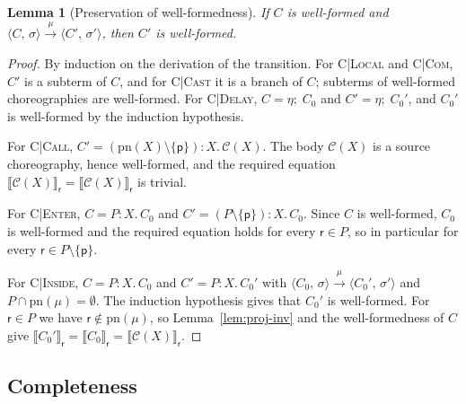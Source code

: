 \documentclass[11pt]{article}
\theoremstyle{plain}
\newtheorem{lemma}[theorem]{Lemma}
\theoremstyle{definition}
\theoremstyle{remark}
\newcommand{\seq}{;\;}
\newcommand{\pp}{\mathsf{p}}
\newcommand{\rr}{\mathsf{r}}
\newcommand{\pn}{\mathrm{pn}}
\newcommand{\conf}[2]{\langle #1,\, #2\rangle}
\newcommand{\lto}[1]{\xrightarrow{\;#1\;}}
\newcommand{\proj}[2]{\llbracket #1 \rrbracket_{#2}}
\newcommand{\rn}[1]{{\normalfont\scshape #1}}
\newcommand{\Defs}{\mathcal{C}}
\newcommand{\body}[1]{\Defs(#1)}
\newcommand{\rt}[3]{#1\mathbin{:}#2.\,#3}
\begin{document}
\begin{lemma}[Preservation of well-formedness]\label{lem:wf-pres}
  If $C$ is well-formed and $\conf{C}{\sigma}\lto{\mu}\conf{C'}{\sigma'}$,
  then $C'$ is well-formed.
\end{lemma}
\begin{proof}
  By induction on the derivation of the transition.  For \rn{C|Local} and
  \rn{C|Com}, $C'$ is a subterm of $C$, and for \rn{C|Cast} it is a branch of
  $C$; subterms of well-formed choreographies are well-formed.  For
  \rn{C|Delay}, $C = \eta\seq C_0$ and $C' = \eta\seq C_0'$, and $C_0'$ is
  well-formed by the induction hypothesis.

  For \rn{C|Call}, $C' = \rt{(\pn(X)\setminus\{\pp\})}{X}{\body{X}}$.  The
  body $\body{X}$ is a source choreography, hence well-formed, and the
  required equation $\proj{\body{X}}{\rr} = \proj{\body{X}}{\rr}$ is trivial.

  For \rn{C|Enter}, $C = \rt{P}{X}{C_0}$ and
  $C' = \rt{(P\setminus\{\pp\})}{X}{C_0}$.  Since $C$ is well-formed, $C_0$ is
  well-formed and the required equation holds for every $\rr\in P$, so in
  particular for every $\rr\in P\setminus\{\pp\}$.

  For \rn{C|Inside}, $C = \rt{P}{X}{C_0}$ and $C' = \rt{P}{X}{C_0'}$ with
  $\conf{C_0}{\sigma}\lto{\mu}\conf{C_0'}{\sigma'}$ and
  $P\cap\pn(\mu)=\emptyset$.  The induction hypothesis gives that $C_0'$ is
  well-formed.  For $\rr\in P$ we have $\rr\notin\pn(\mu)$, so
  Lemma~\ref{lem:proj-inv} and the well-formedness of $C$ give
  $\proj{C_0'}{\rr} = \proj{C_0}{\rr} = \proj{\body{X}}{\rr}$.
\end{proof}

\subsection{Completeness}
\end{document}
